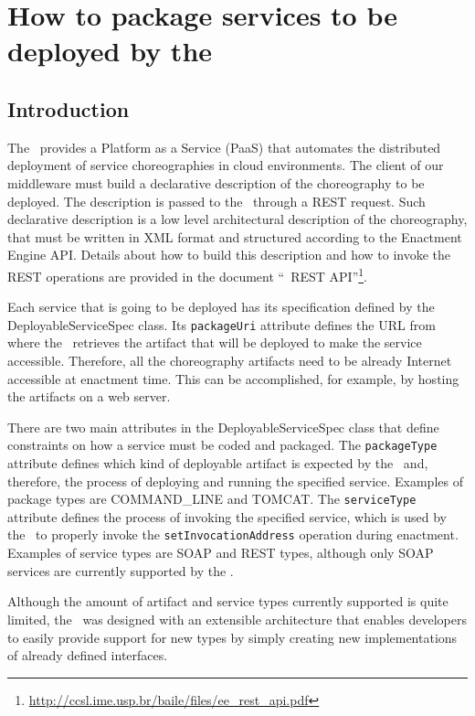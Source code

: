 
\chapter{How to package services to be deployed by the \ee}

\section{Introduction}

The \ee\ provides a Platform as a Service (PaaS) that automates the distributed deployment of service choreographies in cloud environments. The client of our middleware must build a declarative description of the choreography to be deployed. The description is passed to the \ee\ through a REST request. Such declarative description is a low level architectural description of the choreography, that must be written in XML format and structured according to the Enactment Engine API. Details about how to build this description and how to invoke the REST operations are provided in the document ``\ee\ REST API''\footnote{\url{http://ccsl.ime.usp.br/baile/files/ee\_rest\_api.pdf}}. 

Each service that is going to be deployed has its specification defined by the \textsf{DeployableServiceSpec} class. Its \texttt{packageUri} attribute defines the URL from where the \ee\ retrieves the artifact that will be deployed to make the service accessible. Therefore, all the choreography artifacts need to be already Internet accessible at enactment time. This can be accomplished, for example, by hosting the artifacts on a web server.

There are two main attributes in the \textsf{DeployableServiceSpec} class that define constraints on how a service must be coded and packaged. The \texttt{packageType} attribute defines which kind of deployable artifact is expected by the \ee\ and, therefore, the process of deploying and running the specified service. Examples of package types are COMMAND\_LINE and TOMCAT. The \texttt{serviceType} attribute defines the process of invoking the specified service, which is used by the \ee\ to properly invoke the \texttt{setInvocationAddress} operation during enactment. Examples of service types are SOAP and REST types, although only SOAP services are currently supported by the \ee.

Although the amount of artifact and service types currently supported is quite limited, the \ee\ was designed with an extensible architecture that enables developers to easily provide support for new types by simply creating new implementations of already defined interfaces.

